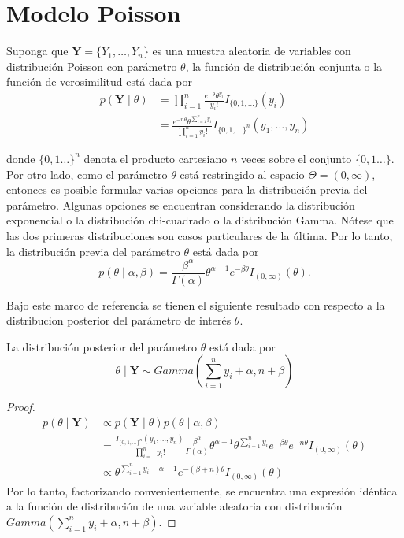 \documentclass[10pt,openright]{book}\usepackage[]{graphicx}\usepackage[]{color}
\begin{document}
    \section{Modelo Poisson}
    
    Suponga que $\mathbf{Y}=\{Y_1,\ldots,Y_n\}$ es una muestra aleatoria de variables con distribuci\'on Poisson con par\'ametro $\theta$, la funci\'on de distribuci\'on conjunta o la funci\'on de verosimilitud est\'a dada por
    \begin{align*}
    p(\mathbf{Y} \mid \theta)&=\prod_{i=1}^n\frac{e^{-\theta}\theta^{y_i}}{y_i!}I_{\{0,1,\ldots\}}(y_i)\\
    &=\frac{e^{-n\theta}\theta^{\sum_{i=1}^ny_i}}{\prod_{i=1}^ny_i!}I_{\{0,1,\ldots\}^n}(y_1,\ldots,y_n)
    \end{align*}
    
    donde $\{0,1\ldots\}^n$ denota el producto cartesiano $n$ veces sobre el conjunto $\{0,1\ldots\}$. Por otro lado, como el par\'ametro $\theta$ est\'a restringido al espacio $\Theta=(0,\infty)$, entonces es posible formular varias opciones para la distribuci\'on previa del par\'ametro. Algunas opciones se encuentran considerando la distribuci\'on exponencial o la distribuci\'on chi-cuadrado o la distribuci\'on Gamma. N\'otese que las dos primeras distribuciones son casos particulares de la \'ultima. Por lo tanto, la distribuci\'on previa del par\'ametro $\theta$ est\'a dada por
    \begin{equation}\label{prior_Gamma}
    p(\theta \mid \alpha,\beta)=\frac{\beta^\alpha}{\Gamma(\alpha)}\theta^{\alpha-1} e^{-\beta\theta}I_{(0,\infty)}(\theta).
    \end{equation}
    
    Bajo este marco de referencia se tienen el siguiente resultado con respecto a la distribucion posterior del par\'ametro de inter\'es $\theta$.
    \begin{Res}
    \label{ResPoissonPost}
    La distribuci\'on posterior del par\'ametro $\theta$ est\'a dada por
    \begin{equation*}
    \theta \mid \mathbf{Y} \sim Gamma\left(\sum_{i=1}^ny_i+\alpha,n+\beta\right)
    \end{equation*}
    \end{Res}
    
    \begin{proof}
    \begin{align*}
    p(\theta \mid \mathbf{Y})&\propto p(\mathbf{Y} \mid \theta)p(\theta \mid \alpha,\beta)\\
    &=\frac{I_{\{0,1,\ldots\}^n}(y_1,\ldots,y_n)}{\prod_{i=1}^ny_i!}\frac{\beta^\alpha}{\Gamma(\alpha)}
    \theta^{\alpha-1}\theta^{\sum_{i=1}^ny_i}e^{-\beta\theta}e^{-n\theta}I_{(0,\infty)}(\theta)\\
    &\propto \theta^{\sum_{i=1}^ny_i+\alpha-1}e^{-(\beta+n)\theta}I_{(0,\infty)}(\theta)
    \end{align*}
    Por lo tanto, factorizando convenientemente, se encuentra una expresi\'on id\'entica a la funci\'on de distribuci\'on de una variable aleatoria con distribuci\'on $Gamma(\sum_{i=1}^ny_i+\alpha,n+\beta)$.
    \end{proof}
    
\end{document}
